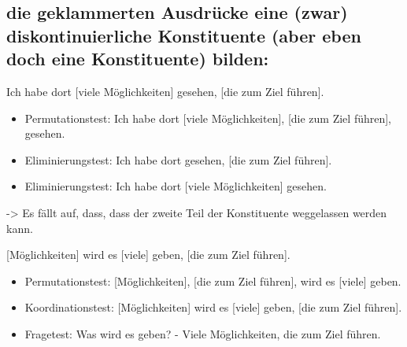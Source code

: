 \subsection{die geklammerten Ausdrücke eine (zwar) diskontinuierliche Konstituente (aber eben doch eine Konstituente) bilden:}

Ich habe dort [viele Möglichkeiten] gesehen, [die zum Ziel führen].
\begin{itemize}
  \item Permutationstest: Ich habe dort [viele Möglichkeiten], [die zum Ziel führen], gesehen.
  \item Eliminierungstest: Ich habe dort gesehen, [die zum Ziel führen].
  \item Eliminierungstest: Ich habe dort [viele Möglichkeiten] gesehen.
\end{itemize}
-> Es fällt auf, dass, dass der zweite Teil der Konstituente weggelassen werden kann.

[Möglichkeiten] wird es [viele] geben, [die zum Ziel führen].
\begin{itemize}
  \item Permutationstest: [Möglichkeiten], [die zum Ziel führen], wird es [viele] geben.
  \item Koordinationstest: [Möglichkeiten] wird es [viele] geben, [die zum Ziel führen].
  \item Fragetest: Was wird es geben? - Viele Möglichkeiten, die zum Ziel führen.
\end{itemize}
